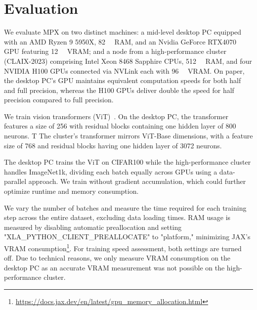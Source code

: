 \documentclass[logo]{dsme}
\newcommand{\mpx}{\textsc{MPX}}
\begin{document}
\section{Evaluation}
We evaluate \mpx{} on two distinct machines: a mid-level desktop PC equipped with an AMD Ryzen 9 5950X, \qty{82}{\giga\byte} RAM, and an Nvidia GeForce RTX4070 GPU featuring \qty{12}{\giga\byte} VRAM; and a node from a high-performance cluster (CLAIX-2023) comprising Intel Xeon 8468 Sapphire CPUs, \qty{512}{\giga\byte} RAM, and four NVIDIA H100 GPUs connected via NVLink each with \qty{96}{\giga\byte} VRAM. 
On paper, the desktop PC's GPU maintains equivalent computation speeds for both half and full precision, whereas the H100 GPUs deliver double the speed for half precision compared to full precision.

We train vision transformers (ViT)~\citep{dosovitskiy2020image,steiner2021train}. On the desktop PC, the transformer features a size of 256 with residual blocks containing one hidden layer of 800 neurons. T
The cluster's transformer mirrors ViT-Base dimensions, with a feature size of 768 and residual blocks having one hidden layer of 3072 neurons.

The desktop PC trains the ViT on CIFAR100 while the high-performance cluster handles ImageNet1k, dividing each batch equally across GPUs using a data-parallel approach. We train without gradient accumulation, which could further optimize runtime and memory consumption.

We vary the number of batches and measure the time required for each training step across the entire dataset, excluding data loading times. 
RAM usage is measured by disabling automatic preallocation and setting "XLA\_PYTHON\_CLIENT\_PREALLOCATE" to "platform," minimizing JAX's VRAM consumption\footnote{\url{https://docs.jax.dev/en/latest/gpu_memory_allocation.html}}. 
For training speed assessment, both settings are turned off.
Due to technical reasons, we only measure VRAM consumption on the desktop PC as an accurate VRAM measurement was not possible on the high-performance cluster. 
\end{document}
